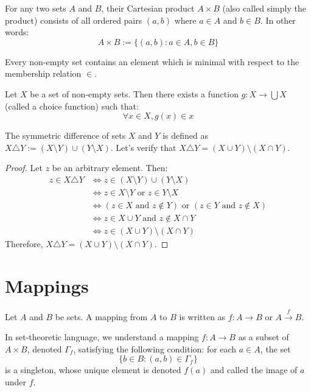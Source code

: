 \documentclass[11pt,lang=en]{elegantbook}
\begin{document}
\begin{definition}
  For any two sets $A$ and $B$, their Cartesian product $A \times B$ (also called simply the product) consists of all ordered pairs $(a,b)$ where $a \in A$ and $b \in B$. In other words:
  \[
    A \times B := \{(a,b) : a \in A, b \in B\}
  \]
\end{definition}

\begin{axiom}
  Every non-empty set contains an element which is minimal with respect to the membership relation $\in$.
\end{axiom}

\begin{axiom}
  Let $X$ be a set of non-empty sets. Then there exists a function $g : X \to \bigcup X$ (called a choice function) such that:
  \[
    \forall x \in X, g(x) \in x
  \]
\end{axiom}

\begin{example}
  The symmetric difference of sets $X$ and $Y$ is defined as $X \triangle Y := (X \setminus Y) \cup (Y \setminus X)$.
  Let's verify that $X \triangle Y = (X \cup Y) \setminus (X \cap Y)$.

  \begin{proof}
    Let $z$ be an arbitrary element. Then:
    \begin{align*}
      z \in X \triangle Y &\iff z \in (X \setminus Y) \cup (Y \setminus X) \\
      &\iff z \in X \setminus Y \text{ or } z \in Y \setminus X \\
      &\iff (z \in X \text{ and } z \notin Y) \text{ or } (z \in Y \text{ and } z \notin X) \\
      &\iff z \in X \cup Y \text{ and } z \notin X \cap Y \\
      &\iff z \in (X \cup Y) \setminus (X \cap Y)
    \end{align*}
    Therefore, $X \triangle Y = (X \cup Y) \setminus (X \cap Y)$.
  \end{proof}
\end{example}

\section{Mappings}

\begin{definition}[Mapping]
  Let $A$ and $B$ be sets. A mapping from $A$ to $B$ is written as $f : A \to B$ or $A \xrightarrow{f} B$.

  In set-theoretic language, we understand a mapping $f : A \to B$ as a subset of $A \times B$, denoted $\Gamma_f$, satisfying the following condition: for each $a \in A$, the set
  \[
    \{b \in B : (a,b) \in \Gamma_f\}
  \]
  is a singleton, whose unique element is denoted $f(a)$ and called the image of $a$ under $f$.
\end{definition}
\end{document}
